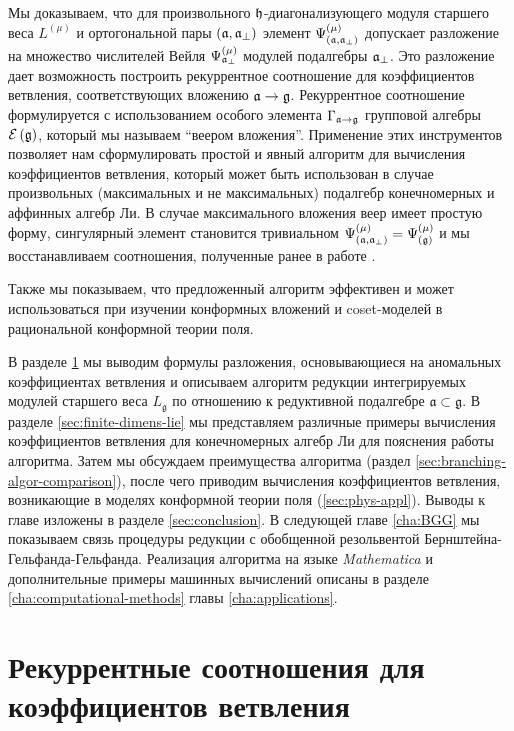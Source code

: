 Мы доказываем, что для произвольного $\mathfrak{h}$-диагонализующего модуля старшего веса $L^{\left( \mu \right)}$ и ортогональной пары $\left(  \mathfrak{a}, \mathfrak{a}_{\perp} \right)$ элемент
$\Psi ^{\left( \mu \right) }_{\left(  \mathfrak{a}, \mathfrak{a}_{\perp} \right)}$ допускает разложение на множество числителей Вейля $\Psi ^{\left( \mu \right) }_{ \mathfrak{a}_{\perp} }$ модулей подалгебры $\mathfrak{a}_{\perp}$.
Это разложение дает возможность построить рекуррентное соотношение для коэффициентов ветвления, соответствующих вложению $\mathfrak{a} \rightarrow \mathfrak{g} $. Рекуррентное соотношение формулируется с использованием особого элемента  $\Gamma_{\mathfrak{a} \rightarrow \mathfrak{g}}$ групповой алгебры
$\mathcal{E}\left( \mathfrak{g} \right)$, который мы называем ``веером вложения''. 
Применение этих инструментов позволяет нам сформулировать простой и явный алгоритм для вычисления коэффициентов ветвления, который может быть использован в случае произвольных (максимальных и не максимальных) подалгебр конечномерных и аффинных алгебр Ли. 
В случае максимального вложения веер имеет простую форму, сингулярный элемент становится тривиальном $\Psi ^{\left( \mu \right) }_{\left(  \mathfrak{a}, \mathfrak{a}_{\perp} \right)}=\Psi ^{\left( \mu \right) }_{\left(  \mathfrak{g}\right)}$ и мы восстанавливаем соотношения, полученные ранее в работе \cite{ilyin812pbc}.

Также мы показываем, что предложенный алгоритм эффективен и может использоваться при изучении конформных вложений и coset-моделей в рациональной конформной теории поля.

В разделе \ref{sec:branching} мы выводим формулы разложения, основывающиеся на аномальных коэффициентах ветвления и описываем алгоритм редукции интегрируемых модулей старшего веса $L_{\mathfrak{g}}$ по отношению к редуктивной подалгебре  $\mathfrak{a}\subset \mathfrak{g}$. В разделе \ref{sec:finite-dimens-lie}  мы представляем различные примеры вычисления коэффициентов ветвления для конечномерных алгебр Ли для пояснения работы алгоритма. Затем мы обсуждаем преимущества алгоритма (раздел \ref{sec:branching-algor-comparison}), после чего приводим вычисления коэффициентов ветвления, возникающие в моделях конформной теории поля (\ref{sec:phys-appl}). Выводы к главе изложены в разделе \ref{sec:conclusion}. В следующей главе \ref{cha:BGG} мы показываем связь процедуры редукции с обобщенной резольвентой Бернштейна-Гельфанда-Гельфанда.  Реализация алгоритма на языке {\it Mathematica} и дополнительные примеры машинных вычислений описаны в разделе \ref{cha:computational-methods} главы \ref{cha:applications}. 


\section{Рекуррентные соотношения для коэффициентов ветвления}
\label{sec:branching}

